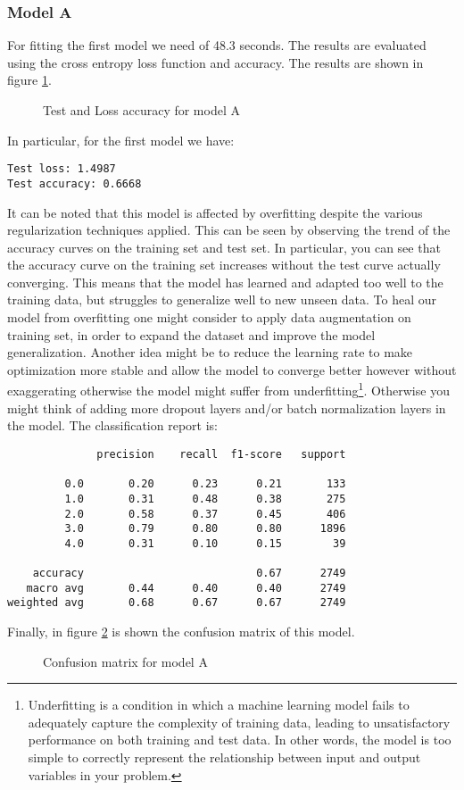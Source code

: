 \subsubsection{Model A}
For fitting the first model we need of 48.3 seconds. The results are evaluated using the cross entropy loss function and accuracy. The results are shown in figure \ref{fig:testA}.
\begin{figure}[h!]
    \testA
    \caption{Test and Loss accuracy for model A}
    \label{fig:testA}
\end{figure}
In particular, for the first model we have:
\begin{verbatim}
Test loss: 1.4987
Test accuracy: 0.6668
\end{verbatim}
It can be noted that this model is affected by overfitting despite the various regularization techniques applied. This can be seen by observing the trend of the accuracy curves on the training set and test set. In particular, you can see that the accuracy curve on the training set increases without the test curve actually converging. This means that the model has learned and adapted too well to the training data, but struggles to generalize well to new unseen data. To heal our model from overfitting one might consider to apply data augmentation on training set, in order to expand the dataset and improve the model generalization. Another idea might be to reduce the learning rate to make optimization more stable and allow the model to converge better however without exaggerating otherwise the model might suffer from underfitting\footnote{Underfitting is a condition in which a machine learning model fails to adequately capture the complexity of training data, leading to unsatisfactory performance on both training and test data. In other words, the model is too simple to correctly represent the relationship between input and output variables in your problem.}. Otherwise you might think of adding more dropout layers and/or batch normalization layers in the model. The classification report is:
\begin{verbatim}
              precision    recall  f1-score   support

         0.0       0.20      0.23      0.21       133
         1.0       0.31      0.48      0.38       275
         2.0       0.58      0.37      0.45       406
         3.0       0.79      0.80      0.80      1896
         4.0       0.31      0.10      0.15        39

    accuracy                           0.67      2749
   macro avg       0.44      0.40      0.40      2749
weighted avg       0.68      0.67      0.67      2749
\end{verbatim}
Finally, in figure \ref{fig:CMA} is shown the confusion matrix of this model.
\begin{figure}[h!]
    \CMA
    \caption{Confusion matrix for model A}
    \label{fig:CMA}
\end{figure}

